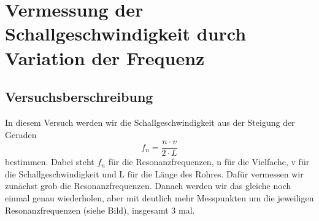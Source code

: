 \documentclass[12pt,a4paper]{article}
\author{Gruppe C14 \\ Julián Häck, Martin Koytek, Lars Wenning, Erik Zimmermann}
\begin{document}
\section{Vermessung der Schallgeschwindigkeit durch Variation der Frequenz}
\subsection{Versuchsberschreibung}
In diesem Versuch werden wir die Schallgeschwindigkeit aus der Steigung der Geraden 
\begin{equation}
f_n = \frac{n\cdot v}{2\cdot L}
\end{equation}
bestimmen. Dabei steht $f_n$ für die Resonanzfrequenzen, n für die Vielfache, v für die Schallgeschwindigkeit und L für die Länge des Rohres. Dafür vermessen wir zunächst grob die Resonanzfrequenzen.
Danach werden wir das gleiche noch einmal genau wiederholen, aber mit deutlich mehr Messpunkten um die jeweiligen Resonanzfrequenzen (siehe Bild), insgesamt 3 mal.
\end{document}
